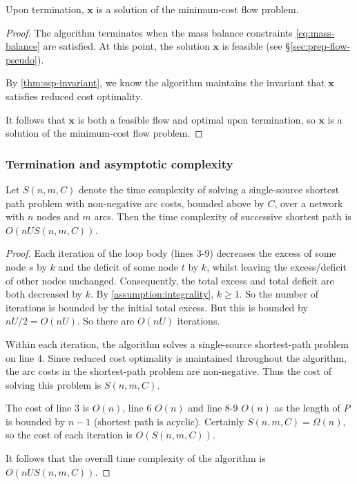 \begin{thm} \label{thm:ssp-correctness}
Upon termination, $\mathbf{x}$ is a solution of the minimum-cost flow problem.
\end{thm}
\begin{proof}
The algorithm terminates when the mass balance constraints \cref{eq:mass-balance} are satisfied. At this point, the solution $\mathbf{x}$ is feasible (see \S\ref{sec:prep-flow-pseudo}). 

By \cref{thm:ssp-invariant}, we know the algorithm maintains the invariant that $\mathbf{x}$ satisfies reduced cost optimality. 

It follows that $\mathbf{x}$ is both a feasible flow and optimal upon termination, so $\mathbf{x}$ is a solution of the minimum-cost flow problem.
\end{proof}

\subsubsection{Termination and asymptotic complexity}

\begin{thm} \label{thm:ssp-complexity}
Let $S(n,m,C)$ denote the time complexity of solving a single-source shortest path problem with non-negative arc costs, bounded above by $C$, over a network with $n$ nodes and $m$ arcs. Then the time complexity of successive shortest path is $O(nUS(n,m,C))$.
\end{thm}
\begin{proof}
Each iteration of the loop body (lines 3-9) decreases the excess of some node $s$ by $k$ and the deficit of some node $t$ by $k$, whilst leaving the excess/deficit of other nodes unchanged. Consequently, the total excess and total deficit are both decreased by $k$. By \cref{assumption:integrality}, $k \geq 1$. So the number of iterations is bounded by the initial total excess. But this is bounded by $nU/2 = O(nU)$. So there are $O(nU)$ iterations.

Within each iteration, the algorithm solves a single-source shortest-path problem on line 4. Since reduced cost optimality is maintained throughout the algorithm, the arc costs in the shortest-path problem are non-negative\footnotemark. Thus the cost of solving this problem is $S(n,m,C)$.

The cost of line 3 is $O(n)$, line 6 $O(n)$ and line 8-9 $O(n)$ as the length of $P$ is bounded by $n-1$ (shortest path is acyclic). Certainly $S(n,m,C) = \Omega(n)$, so the cost of each iteration is $O(S(n,m,C))$.

It follows that the overall time complexity of the algorithm is $O(nUS(n,m,C))$.
\end{proof}

